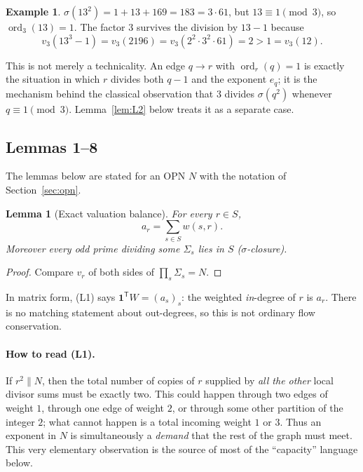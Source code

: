 \documentclass[11pt]{article}
\newtheorem{lemma}[theorem]{Lemma}
\theoremstyle{definition}
\newtheorem{example}[theorem]{Example}
\theoremstyle{remark}
\DeclareMathOperator{\ord}{ord}
\newcommand{\one}{\mathbf{1}}
\begin{document}
\begin{example}\label{ex:13}
$\sigma(13^2)=1+13+169=183=3\cdot 61$, but $13\equiv 1\pmod 3$, so
$\ord_3(13)=1$. The factor $3$ survives the division by $13-1$ because
\[
v_3(13^3-1)=v_3(2196)=v_3(2^2\cdot 3^2\cdot 61)=2>1=v_3(12).
\]
\end{example}

This is not merely a technicality.  An edge $q\to r$ with $\ord_r(q)=1$ is
exactly the situation in which $r$ divides both $q-1$ and the exponent
$e_q$; it is the mechanism behind the classical observation that $3$ divides
$\sigma(q^2)$ whenever $q\equiv1\pmod3$.  Lemma~\ref{lem:L2} below treats
it as a separate case.

\subsection{Lemmas 1--8}

The lemmas below are stated for an OPN $N$ with the notation of
Section~\ref{sec:opn}.

\begin{lemma}[Exact valuation balance]\label{lem:L1}
For every $r\in S$,
\[
a_r=\sum_{s\in S}w(s,r).\tag{L1}
\]
Moreover every odd prime dividing some $\Sigma_s$ lies in $S$
(\emph{$\sigma$-closure}).
\end{lemma}

\begin{proof}
Compare $v_r$ of both sides of $\prod_s\Sigma_s=N$.
\end{proof}

In matrix form, (L1) says $\one^{\mathsf T}W=(a_s)_s$: the weighted
\emph{in}-degree of $r$ is $a_r$. There is no matching statement about
out-degrees, so this is not ordinary flow conservation.

\paragraph{How to read (L1).}
If $r^2\parallel N$, then the total number of copies of $r$ supplied by
\emph{all the other} local divisor sums must be exactly two.  This could
happen through two edges of weight $1$, through one edge of weight $2$, or
through some other partition of the integer $2$; what cannot happen is a
total incoming weight $1$ or $3$.  Thus an exponent in $N$ is simultaneously
a \emph{demand} that the rest of the graph must meet.  This very elementary
observation is the source of most of the ``capacity'' language below.
\end{document}
